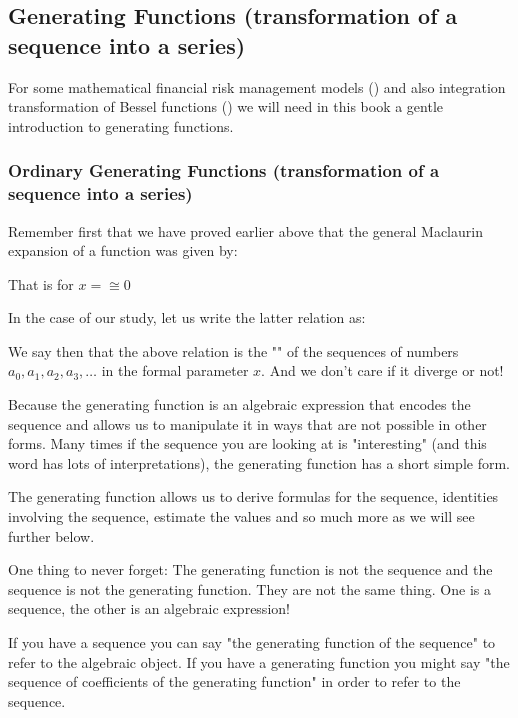 	\pagebreak
	\subsection{Generating Functions (transformation of a sequence into a series)}
	For some mathematical financial risk management models () and also integration transformation of Bessel functions () we will need in this book a gentle introduction to generating functions.
	
	\subsubsection{Ordinary Generating Functions (transformation of a sequence into a series)}
	Remember first that we have proved earlier above that the general Maclaurin expansion of a function was given by:
	
	That is for $x=\cong 0$
	
	In the case of our study, let us write the latter relation as:
	
	We say then that the above relation is the "\label{ordinary generating function}" of the sequences of numbers $a_0,a_1,a_2,a_3,\ldots$ in the formal parameter $x$. And we don't care if it diverge or not!
	
	Because the generating function is an algebraic expression that encodes the sequence and allows us to manipulate it in ways that are not possible in other forms. Many times if the sequence you are looking at is "interesting" (and this word has lots of interpretations), the generating function has a short simple form.

	The generating function allows us to derive formulas for the sequence, identities involving the sequence, estimate the values and so much more as we will see further below.	
	
	One thing to never forget: The generating function is not the sequence and the sequence is not the generating function. They are not the same thing. One is a sequence, the other is an algebraic expression!

	If you have a sequence you can say "the generating function of the sequence" to refer to the algebraic object. If you have a generating function you might say "the sequence of coefficients of the generating function" in order to refer to the sequence.
	
